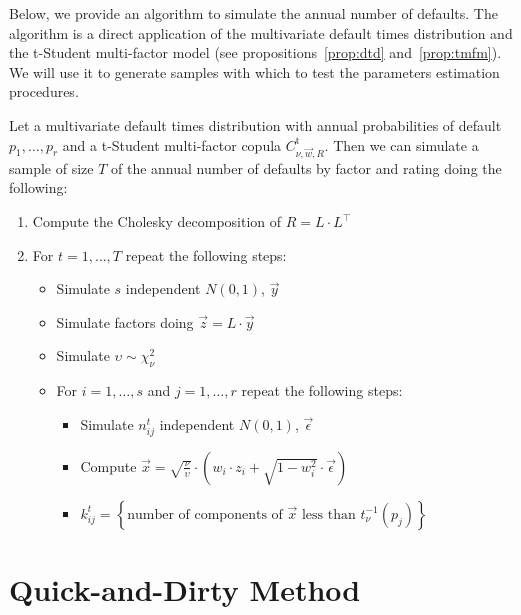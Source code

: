 \documentclass[11pt,fleqn]{book} %
\begin{document}
Below, we provide an algorithm to simulate the annual number of defaults. The 
algorithm is a direct application of the multivariate default times distribution
and the t-Student multi-factor model (see propositions~\ref{prop:dtd} 
and~\ref{prop:tmfm}). We will use it to generate samples with which to 
test the parameters estimation procedures. 

\begin{algorithm}
	\label{alg:snod}
	Let a multivariate default times distribution with annual probabilities 
	of default $p_1,\dots,p_r$ and a t-Student multi-factor copula 
	$C_{\nu,\vec{w},R}^{\text{t}}$. Then we can simulate a sample of size $T$ 
	of the annual number of defaults by factor and rating doing the following:
	\begin{enumerate}
		\item Compute the Cholesky decomposition of $R = L \cdot L^\intercal$
		\item For $t=1,\dots,T$ repeat the following steps:
		\begin{itemize}
			\item Simulate $s$ independent $N(0,1)$, $\vec{y}$
			\item Simulate factors doing $\vec{z} = L \cdot \vec{y}$
			\item Simulate $\upsilon \sim \chi_{\nu}^2$
			\item For $i=1,\dots,s$ and $j=1,\dots,r$ repeat the following steps:
			\begin{itemize}
				\item Simulate $n_{ij}^t$ independent $N(0,1)$, $\vec{\epsilon}$
				\item Compute $\vec{x} = \sqrt{\frac{\nu}{\upsilon}} \cdot \left( w_i \cdot z_i + \sqrt{1-w_i^2} \cdot \vec{\epsilon} \right)$
				\item $k_{ij}^t = \left\{ \text{number of components of $\vec{x}$ less than $t_{\nu}^{-1}(p_j)$} \right\} $
			\end{itemize}
		\end{itemize}
	\end{enumerate}
\end{algorithm}

\section{Quick-and-Dirty Method}
\end{document}

